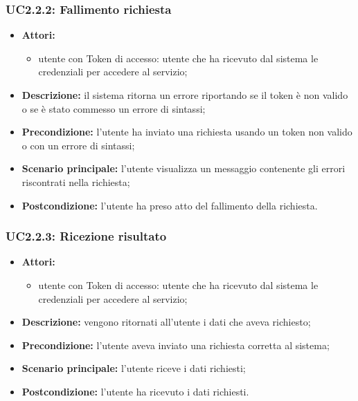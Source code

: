 \subsubsection{UC2.2.2: Fallimento richiesta}
\begin{itemize}
	\item \textbf{Attori:}
	\begin{itemize}
		\item utente con Token di accesso: utente che ha ricevuto dal sistema le credenziali per accedere al servizio;
	\end{itemize}
	\item \textbf{Descrizione:} il sistema ritorna un errore riportando se il token è non valido o se è stato commesso un errore di sintassi;
	\item \textbf{Precondizione:} l'utente ha inviato una richiesta usando un token non valido o con un errore di sintassi;
	\item \textbf{Scenario principale:} l'utente visualizza un messaggio contenente gli errori riscontrati nella richiesta;
	\item \textbf{Postcondizione:} l'utente ha preso atto del fallimento della richiesta.
\end{itemize}

\subsubsection{UC2.2.3: Ricezione risultato}
\begin{itemize}
	\item \textbf{Attori:}
	\begin{itemize}
		\item utente con Token di accesso: utente che ha ricevuto dal sistema le credenziali per accedere al servizio;
	\end{itemize}
	\item \textbf{Descrizione:} vengono ritornati all'utente i dati che aveva richiesto;
	\item \textbf{Precondizione:} l'utente aveva inviato una richiesta corretta al sistema;
	\item \textbf{Scenario principale:} l'utente riceve i dati richiesti;
	\item \textbf{Postcondizione:} l'utente ha ricevuto i dati richiesti.
\end{itemize}

\pagebreak


